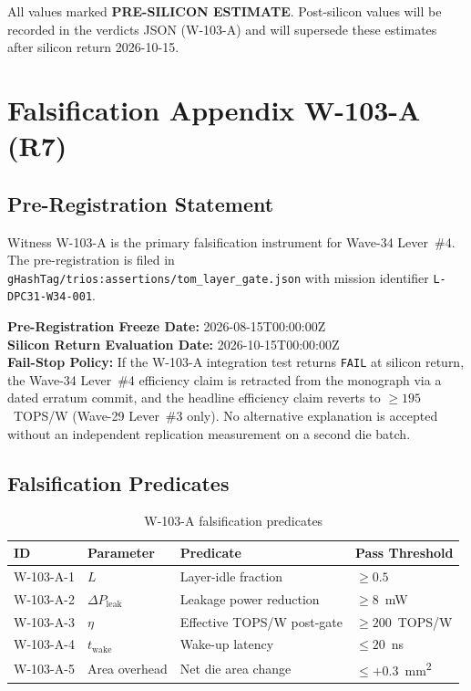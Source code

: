 All values marked \textbf{PRE-SILICON ESTIMATE}.  Post-silicon values
will be recorded in the verdicts JSON (W-103-A) and will supersede these
estimates after silicon return 2026-10-15.

\section{Falsification Appendix W-103-A (R7)}
\label{sec:falsification_appendix}

\subsection{Pre-Registration Statement}

Witness W-103-A is the primary falsification instrument for Wave-34
Lever~\#4.  The pre-registration is filed in
\texttt{gHashTag/trios:assertions/tom\_layer\_gate.json} with
mission identifier \texttt{L-DPC31-W34-001}.

\textbf{Pre-Registration Freeze Date:} 2026-08-15T00:00:00Z \\
\textbf{Silicon Return Evaluation Date:} 2026-10-15T00:00:00Z \\
\textbf{Fail-Stop Policy:} If the W-103-A integration test returns
\texttt{FAIL} at silicon return, the Wave-34 Lever~\#4 efficiency claim
is retracted from the monograph via a dated erratum commit, and the
headline efficiency claim reverts to \(\geq 195\)~TOPS/W (Wave-29
Lever~\#3 only).  No alternative explanation is accepted without an
independent replication measurement on a second die batch.

\subsection{Falsification Predicates}

\begin{table}[ht]
\centering
\caption{W-103-A falsification predicates}
\label{tab:w103a_predicates}
\begin{tabular}{llp{6cm}l}
\hline
ID & Parameter & Predicate & Pass Threshold \\
\hline
W-103-A-1 & \(L\) & Layer-idle fraction & \(\geq 0.5\) \\
W-103-A-2 & \(\Delta P_{\mathrm{leak}}\) & Leakage power reduction & \(\geq 8\)~mW \\
W-103-A-3 & \(\eta\) & Effective TOPS/W post-gate & \(\geq 200\)~TOPS/W \\
W-103-A-4 & \(t_{\mathrm{wake}}\) & Wake-up latency & \(\leq 20\)~ns \\
W-103-A-5 & Area overhead & Net die area change & \(\leq +0.3\)~mm\textsuperscript{2} \\
\hline
\end{tabular}
\end{table}

